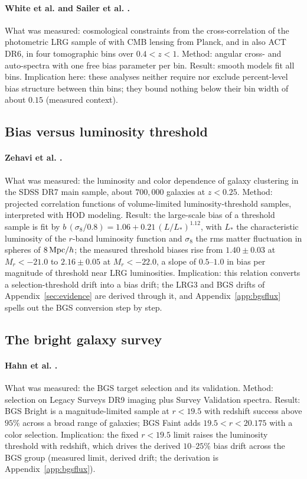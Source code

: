 \documentclass[11pt]{article}
\begin{document}
\paragraph{White et al. \cite{White2022} and Sailer et al.
\cite{Sailer2024}.}
What was measured: cosmological constraints from the
cross-correlation of the photometric LRG sample of \cite{Zhou2023tomo}
with CMB lensing from Planck, and in \cite{Sailer2024} also ACT DR6,
in four tomographic bins over $0.4 < z < 1$.  Method: angular cross-
and auto-spectra with one free bias parameter per bin.  Result:
smooth models fit all bins.  Implication here: these analyses neither
require nor exclude percent-level bias structure between thin bins;
they bound nothing below their bin width of about $0.15$ (measured
context).

\subsection{Bias versus luminosity threshold}

\paragraph{Zehavi et al. \cite{Zehavi2011}.}
What was measured: the luminosity and color dependence of galaxy
clustering in the SDSS DR7 main sample, about $700{,}000$ galaxies
at $z < 0.25$.  Method: projected correlation functions of
volume-limited luminosity-threshold samples, interpreted with HOD
modeling.  Result: the large-scale bias of a threshold sample is fit
by $b\,(\sigma_8/0.8) = 1.06 + 0.21\,(L/L_*)^{1.12}$, with $L_*$ the
characteristic luminosity of the $r$-band luminosity function and
$\sigma_8$ the rms matter fluctuation in spheres of $8\,{\rm Mpc}/h$;
the measured threshold biases rise from $1.40 \pm 0.03$ at
$M_r < -21.0$ to $2.16 \pm 0.05$ at $M_r < -22.0$, a slope of
$0.5$--$1.0$ in bias per magnitude of threshold near LRG
luminosities.  Implication: this relation converts a
selection-threshold drift into a bias drift; the LRG3 and BGS drifts
of Appendix~\ref{sec:evidence} are derived through it, and
Appendix~\ref{app:bgsflux} spells out the BGS conversion step by
step.

\subsection{The bright galaxy survey}

\paragraph{Hahn et al. \cite{Hahn2023}.}
What was measured: the BGS target selection and its validation.
Method: selection on Legacy Surveys DR9 imaging plus Survey
Validation spectra.  Result: BGS Bright is a magnitude-limited
sample at $r < 19.5$ with redshift success above $95\%$ across a
broad range of galaxies; BGS Faint adds $19.5 < r < 20.175$ with a
color selection.  Implication: the fixed $r < 19.5$ limit raises the
luminosity threshold with redshift, which drives the derived
$10$--$25\%$ bias drift across the BGS group (measured limit,
derived drift; the derivation is Appendix~\ref{app:bgsflux}).
\end{document}
